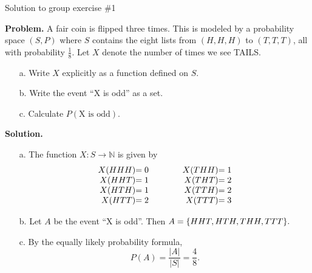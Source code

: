 \documentclass[10pt]{beamer}
\begin{document}
\begin{frame}{Solution to group exercise \#1}

\textbf{Problem.} A fair coin is flipped three times. This is modeled by a probability space $(S,P)$ where $S$ contains the eight lists from $(H,H,H)$ to $(T,T,T)$, all with probability $\frac{1}{8}$.  Let $X$ denote the number of times we see TAILS.
	\begin{itemize} \footnotesize 
	\item[a.] Write $X$ explicitly as a function defined on $S$.
	\item[b.] Write the event \enquote{X is odd} as a set.
	\item[c.] Calculate $P(\text{X is odd})$.
	\end{itemize}
\vfill 

\textbf{Solution.} 
	\begin{itemize} \small
	\item[a.]  The function $X: S \to \mathbb{N}$ is given by
	\[\begin{array}{r@{}lcr@{}l}
	X(HHH) &= 0 &\qquad & X(THH) &=1 \\
	X(HHT) &= 1 &\qquad & X(THT) &=2 \\
	X(HTH) &= 1 &\qquad & X(TTH) &=2 \\
	X(HTT) &= 2 &\qquad & X(TTT) &=3 \\
	\end{array}\]
	\item[b.] Let $A$ be the event \enquote{X is odd}.  Then $A=\{ {HHT, HTH, THH, TTT} \}.$
	\item[c.] By the equally likely probability formula,
	\[ P(A) = \frac{|A|}{|S|}  = \frac{4}{8}. \]
	\end{itemize}
\vfill 
\end{frame}
\end{document}
